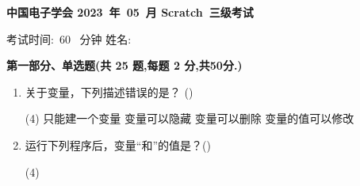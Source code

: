 \documentclass[10pt, a4paper]{article}
\newcommand{\Title}[3]{
    \begin{center}
        \Large \textbf{中国电子学会 #1~年~#2~月 Scratch~#3级考试}
    \end{center}
}
\newcommand{\TimeAndName}[1]{
    \begin{center}
        考试时间:~#1~ 分钟 \qquad\qquad\qquad\qquad 姓名:\underline{\quad\quad\quad\quad}
    \end{center}
}
\newcommand{\hq}{\hfill(\qquad)}
\begin{document}
    \Title{2023}{05}{三} %
    \TimeAndName{60} %

    \vspace{2mm}
    {\noindent\textbf{第一部分、单选题(共 25 题,每题 2 分,共50分.)}}
    \begin{enumerate}
        \item 关于变量，下列描述错误的是？ \hq
        \begin{tasks}(4)
            \task 只能建一个变量
            \task 变量可以隐藏
            \task 变量可以删除
            \task 变量的值可以修改
        \end{tasks}

        \item 运行下列程序后，变量“和”的值是？\hq
        \begin{tasks}(4)
        \end{tasks}


\end{enumerate}
\end{document}
